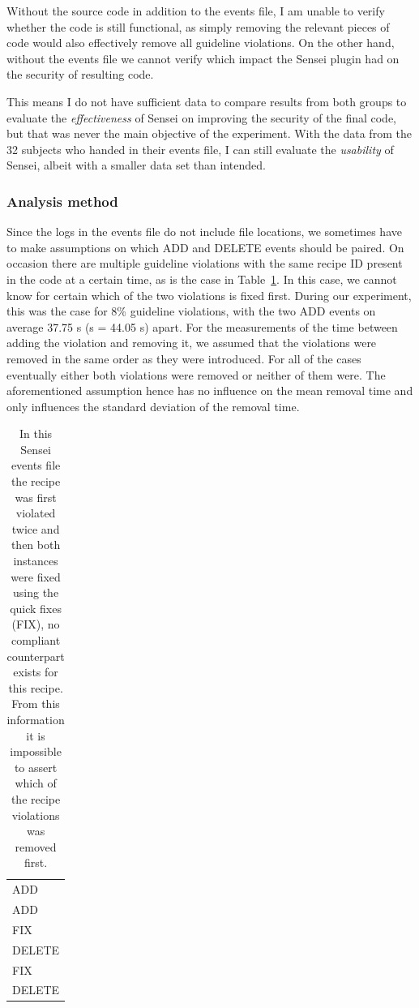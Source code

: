 Without the source code in addition to the events file, I am unable to verify whether the code is still functional, as simply removing the relevant pieces of code would also effectively remove all guideline violations.
On the other hand, without the events file we cannot verify which impact the Sensei plugin had on the security of resulting code.

This means I do not have sufficient data to compare results from both groups to evaluate the \textit{effectiveness} of Sensei on improving the security of the final code, but that was never the main objective of the experiment.
With the data from the 32 subjects who handed in their events file, I can still evaluate the \textit{usability} of Sensei, albeit with a smaller data set than intended.

\subsubsection{Analysis method}
\label{sec:analysis}
Since the logs in the events file do not include file locations, we sometimes have to make assumptions on which ADD and DELETE events should be paired.
On occasion there are multiple guideline violations with the same recipe ID present in the code at a certain time, as is the case in Table~\ref{tab:recipe2}. 
In this case, we cannot know for certain which of the two violations is fixed first.
During our experiment, this was the case for 8\% guideline violations, with the two ADD events on average 37.75 s (s = 44.05 s) apart.
For the measurements of the time between adding the violation and removing it, we assumed that the violations were removed in the same order as they were introduced.
For all of the cases eventually either both violations were removed or neither of them were.
The aforementioned assumption hence has no influence on the mean removal time and only influences the standard deviation of the removal time. 

\begin{table}
    \centering
    \begin{tabular}{|l|}
      \hline
      \cellcolor{scw-orange!30}
      ADD \\
      \cellcolor{scw-orange!30}
      ADD \\
      FIX \\
      \cellcolor{scw-teal!30}
      DELETE \\
      FIX \\
      \cellcolor{scw-teal!30}
      DELETE \\
      \hline
    \end{tabular}
    \caption[Sensei events file with multiple violations at the same time]{In this Sensei events file the recipe was first violated twice and then both instances were fixed using the quick fixes (FIX), no compliant counterpart exists for this recipe. From this information it is impossible to assert which of the recipe violations was removed first.}
    \label{tab:recipe2}
\end{table}

